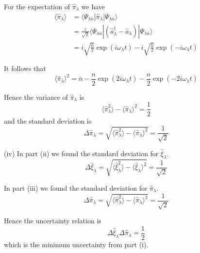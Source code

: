 For the expectation of $\hat\pi_\lambda$ we have
\begin{align*}
\langle\hat\pi_\lambda\rangle
&=\langle\Psi_{\lambda\bar n}|\hat\pi_\lambda|\Psi_{\lambda\bar n}\rangle
\\
&=\frac{i}{\sqrt2}
\langle\Psi_{\lambda\bar n}|\left(\hat a_\lambda^\dag-\hat a_\lambda\right)|\Psi_{\lambda\bar n}\rangle
\\
&=i\sqrt{\frac{\bar n}{2}}\exp(i\omega_\lambda t)-i\sqrt{\frac{\bar n}{2}}\exp(-i\omega_\lambda t)
\end{align*}

It follows that
\begin{equation*}
\langle\hat\pi_\lambda\rangle^2
=\bar n-\frac{n}{2}\exp(2i\omega_\lambda t)-\frac{n}{2}\exp(-2i\omega_\lambda t)
\end{equation*}

Hence the variance of $\hat\pi_\lambda$ is
\begin{equation*}
\langle\hat\pi_\lambda^2\rangle-\langle\hat\pi_\lambda\rangle^2=\frac{1}{2}
\end{equation*}
and the standard deviation is
\begin{equation*}
\Delta\hat\pi_\lambda=\sqrt{\langle\hat\pi_\lambda^2\rangle-\langle\hat\pi_\lambda\rangle^2}=\frac{1}{\sqrt2}
\end{equation*}

(iv) In part (ii) we found the standard deviation for $\hat\xi_\lambda$.
\begin{equation*}
\Delta\hat\xi_\lambda=\sqrt{\langle\hat\xi_\lambda^2\rangle-\langle\hat\xi_\lambda\rangle^2}=\frac{1}{\sqrt2}
\end{equation*}

In part (iii) we found the standard deviation for $\hat\pi_\lambda$.
\begin{equation*}
\Delta\hat\pi_\lambda=\sqrt{\langle\hat\pi_\lambda^2\rangle-\langle\hat\pi_\lambda\rangle^2}=\frac{1}{\sqrt2}
\end{equation*}

Hence the uncertainty relation is
\begin{equation*}
\Delta\hat\xi_\lambda\Delta\hat\pi_\lambda=\frac{1}{2}
\end{equation*}
which is the minimum uncertainty from part (i).


